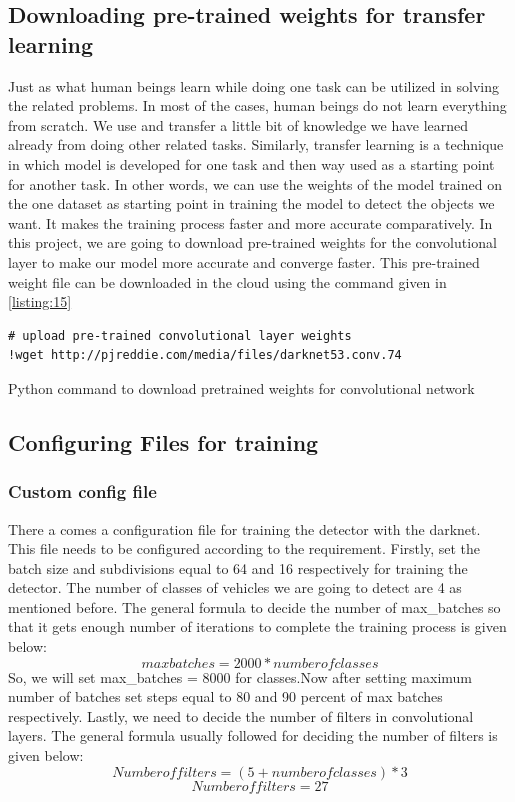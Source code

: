 \subsection{Downloading pre-trained weights for transfer learning}
Just as what human beings learn while doing one task can be utilized in solving the related problems. In most of the cases, human beings do not learn everything from scratch. We use and transfer a little bit of knowledge we have learned already from doing other related tasks. Similarly, transfer learning is a technique in which model is developed for one task and then way used as a starting point for another task. In other words, we can use the weights of the model trained on the one dataset as starting point in training the model to detect the objects we want. It makes the training process faster and more accurate comparatively. In this project, we are going to download pre-trained weights for the convolutional layer to make our model more accurate and converge faster. This pre-trained weight file can be downloaded in the cloud using the command given in \ref{listing:15}
\begin{longlisting}
\begin{verbatim}
# upload pre-trained convolutional layer weights
!wget http://pjreddie.com/media/files/darknet53.conv.74
\end{verbatim}
\caption{Python command to download pretrained weights for convolutional network}
\label{listing:15}
\end{longlisting}
\subsection{Configuring Files for training}
\subsubsection{Custom config file}
There a comes a configuration file for training the detector with the darknet. This file needs to be configured according to the requirement. Firstly, set the batch size and subdivisions equal to 64 and 16 respectively for training the detector. The number of classes of vehicles we are going to detect are 4 as mentioned before. The general formula to decide the number of max\_batches so that it gets enough number of iterations to complete the training process is given below:
\begin{equation} 
max batches = 2000 * number of classes
\end{equation}
So, we will set max\_batches = 8000 for classes.Now after setting maximum number of batches set steps equal to 80 and 90 percent of max batches respectively. Lastly, we need to decide the number of filters in convolutional layers. The general formula usually followed for deciding the number of filters is given below:
\begin{equation} 
Number of filters = (5 + number of classes) *3
\end{equation}
\begin{equation*} 
Number of filters= 27
\end{equation*}
